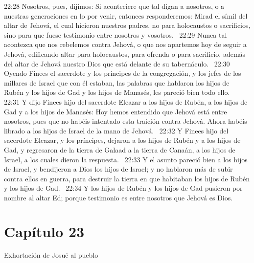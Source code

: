 22:28 Nosotros, pues, dijimos: Si aconteciere que tal digan a nosotros, o a nuestras generaciones en lo por venir, entonces responderemos: Mirad el símil del altar de Jehová, el cual hicieron nuestros padres, no para holocaustos o sacrificios, sino para que fuese testimonio entre nosotros y vosotros.  
22:29 Nunca tal acontezca que nos rebelemos contra Jehová, o que nos apartemos hoy de seguir a Jehová, edificando altar para holocaustos, para ofrenda o para sacrificio, además del altar de Jehová nuestro Dios que está delante de su tabernáculo.  
22:30 Oyendo Finees el sacerdote y los príncipes de la congregación, y los jefes de los millares de Israel que con él estaban, las palabras que hablaron los hijos de Rubén y los hijos de Gad y los hijos de Manasés, les pareció bien todo ello.  
22:31 Y dijo Finees hijo del sacerdote Eleazar a los hijos de Rubén, a los hijos de Gad y a los hijos de Manasés: Hoy hemos entendido que Jehová está entre nosotros, pues que no habéis intentado esta traición contra Jehová. Ahora habéis librado a los hijos de Israel de la mano de Jehová.  
22:32 Y Finees hijo del sacerdote Eleazar, y los príncipes, dejaron a los hijos de Rubén y a los hijos de Gad, y regresaron de la tierra de Galaad a la tierra de Canaán, a los hijos de Israel, a los cuales dieron la respuesta.  
22:33 Y el asunto pareció bien a los hijos de Israel, y bendijeron a Dios los hijos de Israel; y no hablaron más de subir contra ellos en guerra, para destruir la tierra en que habitaban los hijos de Rubén y los hijos de Gad.  
22:34 Y los hijos de Rubén y los hijos de Gad pusieron por nombre al altar Ed; porque testimonio es entre nosotros que Jehová es Dios.  
\section*{Capítulo 23}
Exhortación de Josué al pueblo  

